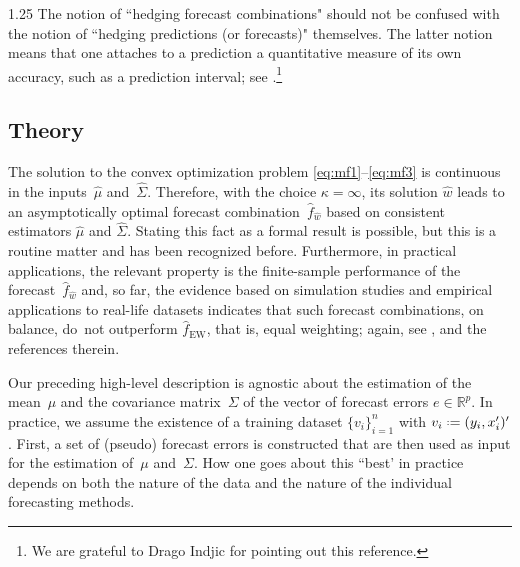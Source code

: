 \documentclass[12pt]{article}
\newcommand*{\defeq}{\mathrel{\vcenter{\baselineskip0.5ex\lineskiplimit0pt\hbox{\scriptsize.}\hbox{\scriptsize.}}}=}
\newcommand{\R}{{\mathbb{R}}}
\numberwithin{equation}{section}
\theoremstyle{plain}
\begin{document}
\begin{spacing}{1.25}
The notion of ``hedging forecast combinations" should not be confused with the notion of ``hedging predictions (or forecasts)" themselves. The latter notion means that one attaches to a prediction a quantitative measure of its own accuracy, such as a prediction interval; see \cite{gammerman:vovk:2007}.\footnote{We are grateful to Drago Indjic for pointing out this reference.}


\subsection{Theory}

The solution to the convex optimization problem
\eqref{eq:mf1}--\eqref{eq:mf3} is continuous in the inputs~$\hat \mu$
and~$\hat \Sigma$.  Therefore, with the
choice $\kappa  = \infty$, its solution $\hat w$
leads to an asymptotically optimal forecast \mbox{combination $\hat
f_{\hat w}$} based on consistent estimators $\hat \mu$ and $\hat
\Sigma$.  Stating this fact as a formal result is possible, but this is a
routine matter and has been recognized before.
Furthermore, in practical applications, the relevant property is the
finite-sample performance
of the forecast~$\hat f_{\hat w}$ and, so far, the evidence based on
simulation studies and empirical applications to real-life datasets
indicates that such forecast combinations, on balance, do~not
outperform $\hat f_{\text {EW}}$, that is, equal weighting; again,
see \citet[Chapter 14]{elliott:timmermann:2016},
\cite{wang:hyndman:li:Kang:2022} and the references therein.




Our preceding high-level description is agnostic about the estimation of the mean~$\mu$ 
and the covariance matrix~$\Sigma$ of the vector
of forecast errors \mbox{$e \in \R^p$}.
In practice, we assume the existence of a training
dataset $\{v_i\}_{i=1}^n$ with $v_i \defeq
(y_i, x_i')'$. First, a set of (pseudo)
forecast errors is constructed that are then used as input for the estimation
of~$\mu$ and~$\Sigma$. How one goes about this ``best' in practice depends on both
the nature of the data and the nature of the individual forecasting
methods.


\end{spacing}
\end{document}

